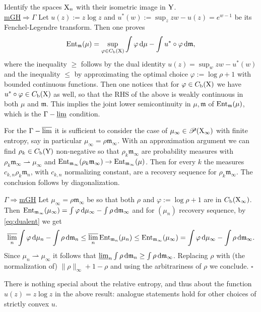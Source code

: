\documentclass[11pt]{article}
\numberwithin{equation}{section}
\newenvironment{idea}{\removelastskip\par\medskip   %
\noindent{\em Idea of the proof} \rm}{\penalty-20\null\hfill$\square$\par\medbreak}
\newcommand{\pr}{\mathscr P}
\newcommand{\X}{{\rm X}}
\newcommand{\Y}{{\rm Y}}
\newcommand{\mm}{{\mathfrak m}}
\newcommand{\entm}[1]{{\rm Ent}_{#1}}
\renewcommand{\d}{{\rm d}}
\newcommand{\lims}{\varlimsup}
\newcommand{\limi}{\varliminf}
\renewcommand{\b}{{\rm b}}
\newcommand{\weakto}{\rightharpoonup}
\begin{document}
\begin{idea} Identify the spaces $\X_n$ with their isometric image in $\Y$. \ \\
\noindent\underline{mGH$\Rightarrow\Gamma$} Let $u(z):=z\log z$ and $u^*(w):=\sup_zzw-u(z)=e^{w-1}$ be its Fenchel-Legendre transform. Then one  proves 
\begin{equation}
\label{eq:dualent}
\entm\mm(\mu)=\sup_{\varphi\in C_\b(\X)}\int \varphi\,\d\mu-\int u^*\circ\varphi\,\d\mm,
\end{equation}
where the inequality $\geq$ follows by the dual identity $u(z)=\sup_wzw-u^*(w)$ and the inequality $\leq $ by approximating the optimal choice $\varphi:=\log\rho+1$ with bounded continuous functions. Then one notices that for $\varphi\in C_\b(\X)$ we have $ u^*\circ\varphi\in C_\b(\X)$ as well, so that the RHS of the above is weakly continuous in both $\mu$ and $\mm$. This implies  the joint lower semicontinuity in $\mu,\mm$ of $\entm\mm(\mu)$, which is the $\Gamma-\limi$ condition.

For the  $\Gamma-\lims$ it is sufficient to consider the case of $\mu_\infty\in \pr(\X_\infty)$ with finite entropy, say in particular $\mu_\infty=\rho\mm_\infty$. With an approximation argument we can find $\rho_k\in C_\b(\Y)$ non-negative so that $\rho_k\mm_\infty$ are probability measures with $\rho_k\mm_\infty\weakto\mu_\infty$ and $\entm{\mm_\infty}(\rho_k\mm_\infty)\to\entm{\mm_\infty}(\mu)$. Then for every $k$ the measures $c_{k,n}\rho_k\mm_n$, with $c_{k,n}$ normalizing constant, are a recovery sequence for  $\rho_k\mm_\infty$. The conclusion follows by diagonalization.

\noindent\underline{$\Gamma\Rightarrow$mGH} Let $\mu_\infty=\rho\mm_\infty$ be so that both $\rho$ and $\varphi:=\log\rho+1$ are in  $C_\b(\X_\infty)$. Then   $\entm{\mm_\infty}(\mu_\infty)=\int \varphi\,\d\mu_\infty-\int \rho\,\d\mm_\infty$ and for  $(\mu_n)$  recovery sequence, by  \eqref{eq:dualent} we get
\[
\lims_n\int \varphi\,\d\mu_n-\int \rho\,\d\mm_n\leq\lims_n\entm{\mm_n}(\mu_n)\leq\entm{\mm_\infty}(\mu_\infty)=\int \varphi\,\d\mu_\infty-\int \rho\,\d\mm_\infty.
\]
Since $\mu_n\weakto\mu_\infty$ it follows that $\limi_n\int \rho\,\d\mm_n\geq \int \rho\,\d\mm_\infty$. Replacing $\rho$ with (the normalization of) $\|\rho\|_{\infty}+1-\rho$ and using the arbitrariness of $\rho$ we conclude.
\end{idea}
There is nothing special about the relative entropy, and thus about the function $u(z)=z\log z$ in the above result: analogue statements hold for other choices of strictly convex  $u$.
\end{document}
